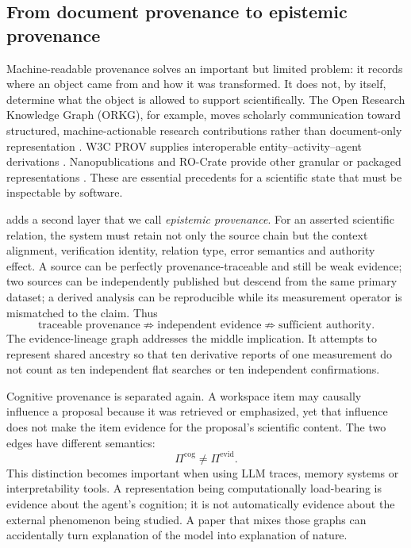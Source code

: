 \subsection{From document provenance to epistemic provenance}

Machine-readable provenance solves an important but limited problem: it records where an object came from and how it was transformed. It does not, by itself, determine what the object is allowed to support scientifically. The Open Research Knowledge Graph (ORKG), for example, moves scholarly communication toward structured, machine-actionable research contributions rather than document-only representation \cite{jaradeh2019orkg}. W3C PROV supplies interoperable entity--activity--agent derivations \cite{w3cprov2013}. Nanopublications and RO-Crate provide other granular or packaged representations \cite{kuhn2018,soilandreyes2022}. These are essential precedents for a scientific state that must be inspectable by software.

\RAKL{} adds a second layer that we call \emph{epistemic provenance}. For an asserted scientific relation, the system must retain not only the source chain but the context alignment, verification identity, relation type, error semantics and authority effect. A source can be perfectly provenance-traceable and still be weak evidence; two sources can be independently published but descend from the same primary dataset; a derived analysis can be reproducible while its measurement operator is mismatched to the claim. Thus
\[
\text{traceable provenance}\not\Rightarrow
\text{independent evidence}\not\Rightarrow
\text{sufficient authority}.
\]
The evidence-lineage graph addresses the middle implication. It attempts to represent shared ancestry so that ten derivative reports of one measurement do not count as ten independent flat searches or ten independent confirmations.

Cognitive provenance is separated again. A workspace item may causally influence a proposal because it was retrieved or emphasized, yet that influence does not make the item evidence for the proposal's scientific content. The two edges have different semantics:
\[
\Pi^{\mathrm{cog}}\neq \Pi^{\mathrm{evid}}.
\]
This distinction becomes important when using LLM traces, memory systems or interpretability tools. A representation being computationally load-bearing is evidence about the agent's cognition; it is not automatically evidence about the external phenomenon being studied. A paper that mixes those graphs can accidentally turn explanation of the model into explanation of nature.

